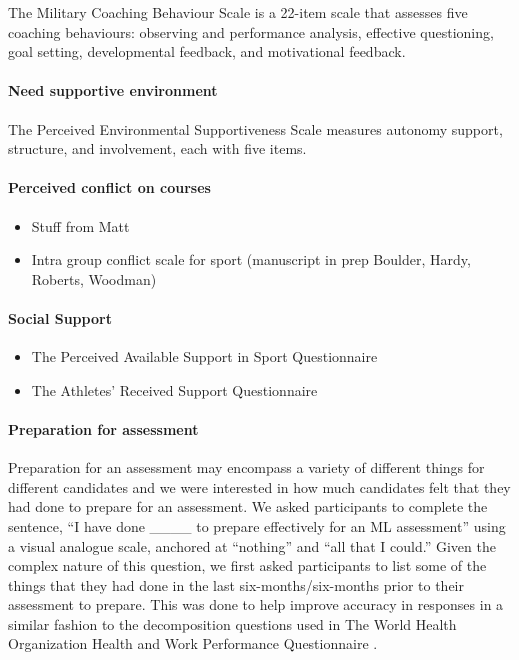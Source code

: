 \documentclass[a4paper,]{book}
\providecommand{\tightlist}{%
  \setlength{\itemsep}{0pt}\setlength{\parskip}{0pt}}
\let\oldparagraph\paragraph
\renewcommand{\paragraph}[1]{\oldparagraph{#1}\mbox{}}
\begin{document}
The Military Coaching Behaviour Scale \citep[MCBS;][]{Wagstaff2018} is a 22-item scale that assesses five coaching behaviours: observing and performance analysis, effective questioning, goal setting, developmental feedback, and motivational feedback.

\hypertarget{need-supportive-environment}{%
\paragraph{Need supportive environment}\label{need-supportive-environment}}

The Perceived Environmental Supportiveness Scale \citep[PESS;][]{Markland2010} measures autonomy support, structure, and involvement, each with five items.

\hypertarget{perceived-conflict-on-courses}{%
\paragraph{Perceived conflict on courses}\label{perceived-conflict-on-courses}}

\begin{itemize}
\tightlist
\item
  Stuff from Matt
\item
  Intra group conflict scale for sport (manuscript in prep Boulder, Hardy, Roberts, Woodman)
\end{itemize}

\hypertarget{social-support}{%
\paragraph{Social Support}\label{social-support}}

\begin{itemize}
\tightlist
\item
  The Perceived Available Support in Sport Questionnaire \citep[PASSQ;][]{Freeman2011}
\item
  The Athletes' Received Support Questionnaire \citep[ARSQ;][]{Freeman2014}
\end{itemize}

\hypertarget{preparation-for-assessment}{%
\paragraph{Preparation for assessment}\label{preparation-for-assessment}}

Preparation for an assessment may encompass a variety of different things for different candidates and we were interested in how much candidates felt that they had done to prepare for an assessment. We asked participants to complete the sentence, ``I have done \_\_\_\_ to prepare effectively for an ML assessment'' using a visual analogue scale, anchored at ``nothing'' and ``all that I could.'' Given the complex nature of this question, we first asked participants to list some of the things that they had done in the last six-months/six-months prior to their assessment to prepare. This was done to help improve accuracy in responses in a similar fashion to the decomposition questions used in The World Health Organization Health and Work Performance Questionnaire \citep{Kessler2003a, Means1991}.
\end{document}

